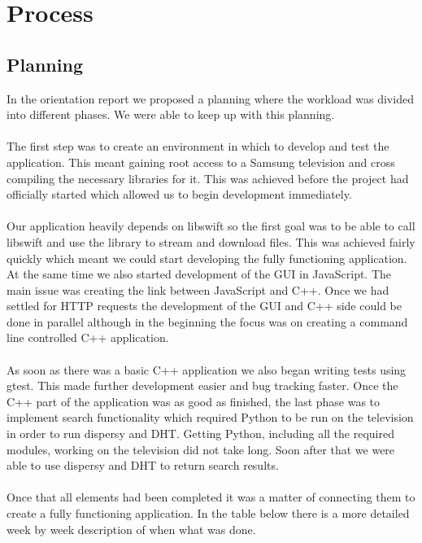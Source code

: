 \chapter{Process}

\section{Planning}

In the orientation report we proposed a planning where the workload was divided into different phases. We were able to keep up with this planning.
\\\\
The first step was to create an environment in which to develop and test the application. This meant gaining root access to a Samsung television and cross compiling the necessary libraries for it. This was achieved before the project had officially started which allowed us to begin development immediately.
\\\\
Our application heavily depends on libswift so the first goal was to be able to call libswift and use the library to stream and download files. This was achieved fairly quickly which meant we could start developing the fully functioning application. At the same time we also started development of the GUI in JavaScript. The main issue was creating the link between JavaScript and C++. Once we had settled for HTTP requests the development of the GUI and C++ side could be done in parallel although in the beginning the focus was on creating a command line controlled C++ application.
\\\\
As soon as there was a basic C++ application we also began writing tests using gtest. This made further development easier and bug tracking faster. Once the C++ part of the application was as good as finished, the last phase was to implement search functionality which required Python to be run on the television in order to run dispersy and DHT. Getting Python, including all the required modules, working on the television did not take long. Soon after that we were able to use dispersy and DHT to return search results.
\\\\
Once that all elements had been completed it was a matter of connecting them to create a fully functioning application. In the table below there is a more detailed week by week description of when what was done.
\\\\

